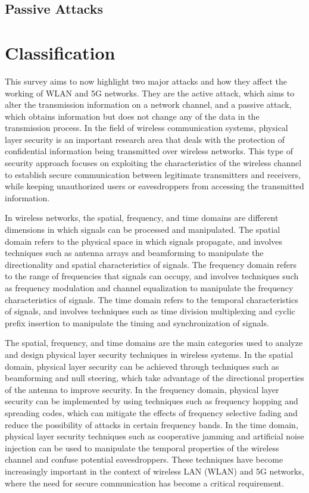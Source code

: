 \documentclass[conference]{IEEEtran}
\begin{document}
\subsection{Passive Attacks}\label{AA}

\section{Classification}%
This survey aims to now highlight two major attacks and how they affect the working of WLAN and 5G networks. They are the active attack, which aims to alter the transmission information on a network channel, and a passive attack, which obtains information but does not change any of the data in the transmission process. In the field of wireless communication systems, physical layer security is an important research area that deals with the protection of confidential information being transmitted over wireless networks. This type of security approach focuses on exploiting the characteristics of the wireless channel to establish secure communication between legitimate transmitters and receivers, while keeping unauthorized users or eavesdroppers from accessing the transmitted information. 

In wireless networks, the spatial, frequency, and time domains are different dimensions in which signals can be processed and manipulated. The spatial domain refers to the physical space in which signals propagate, and involves techniques such as antenna arrays and beamforming to manipulate the directionality and spatial characteristics of signals. The frequency domain refers to the range of frequencies that signals can occupy, and involves techniques such as frequency modulation and channel equalization to manipulate the frequency characteristics of signals. The time domain refers to the temporal characteristics of signals, and involves techniques such as time division multiplexing and cyclic prefix insertion to manipulate the timing and synchronization of signals.

The spatial, frequency, and time domains are the main categories used to analyze and design physical layer security techniques in wireless systems. In the spatial domain, physical layer security can be achieved through techniques such as beamforming and null steering, which take advantage of the directional properties of the antenna to improve security. In the frequency domain, physical layer security can be implemented by using techniques such as frequency hopping and spreading codes, which can mitigate the effects of frequency selective fading and reduce the possibility of attacks in certain frequency bands. In the time domain, physical layer security techniques such as cooperative jamming and artificial noise injection can be used to manipulate the temporal properties of the wireless channel and confuse potential eavesdroppers. These techniques have become increasingly important in the context of wireless LAN (WLAN) and 5G networks, where the need for secure communication has become a critical requirement.
\end{document}
